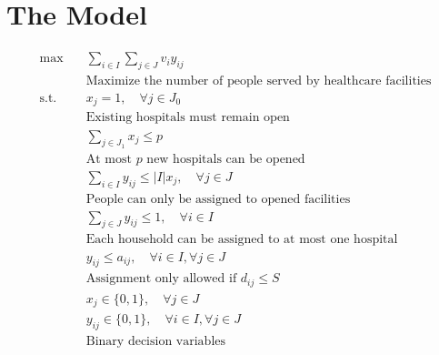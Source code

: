 \documentclass{article}
\begin{document}
\section{The Model}
\begin{align*}
    \max \quad & \sum_{i \in I} \sum_{j \in J} v_i y_{ij} \\
    & \text{Maximize the number of people served by healthcare facilities} \\[6pt]
    \text{s.t.} \quad & x_j = 1, \quad \forall j \in J_0 \\
    & \text{Existing hospitals must remain open} \\[6pt]
    & \sum_{j \in J_1} x_j \leq p \\
    & \text{At most } p \text{ new hospitals can be opened} \\[6pt]
    & \sum_{i \in I} y_{ij} \leq |I| x_j, \quad \forall j \in J \\
    & \text{People can only be assigned to opened facilities} \\[6pt]
    & \sum_{j \in J} y_{ij} \leq 1, \quad \forall i \in I \\
    & \text{Each household can be assigned to at most one hospital} \\[6pt]
    & y_{ij} \leq a_{ij}, \quad \forall i \in I, \forall j \in J \\
    & \text{Assignment only allowed if $d_{ij} \leq S$} \\[6pt]
    & x_j \in \{0,1\}, \quad \forall j \in J \\
    & y_{ij} \in \{0,1\}, \quad \forall i \in I, \forall j \in J \\
    & \text{Binary decision variables}
\end{align*}
\end{document}
